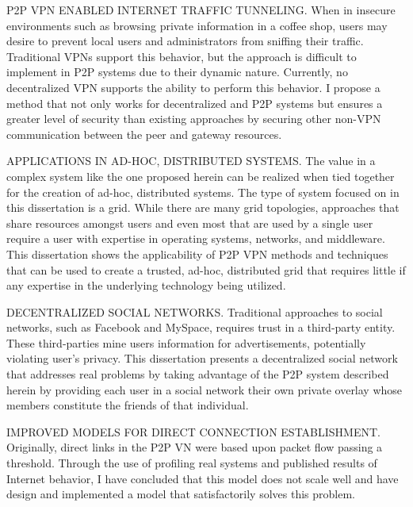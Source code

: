 P2P VPN ENABLED INTERNET TRAFFIC TUNNELING. When in insecure environments such
as browsing private information in a coffee shop, users may desire to prevent
local users and administrators from sniffing their traffic.  Traditional VPNs
support this behavior, but the approach is difficult to implement in P2P
systems due to their dynamic nature.  Currently, no decentralized VPN supports
the ability to perform this behavior.  I propose a method that not only works
for decentralized and P2P systems but ensures a greater level of security than
existing approaches by securing other non-VPN communication between the peer
and gateway resources.

APPLICATIONS IN AD-HOC, DISTRIBUTED SYSTEMS. The value in a complex system
like the one proposed herein can be realized when tied together for the
creation of ad-hoc, distributed systems.  The type of system focused on in
this dissertation is a grid.  While there are many grid topologies, approaches
that share resources amongst users and even most that are used by a single
user require a user with expertise in operating systems, networks, and
middleware.  This dissertation shows the applicability of P2P VPN methods and
techniques that can be used to create a trusted, ad-hoc, distributed grid that
requires little if any expertise in the underlying technology being utilized.

DECENTRALIZED SOCIAL NETWORKS. Traditional approaches to social networks, such
as Facebook and MySpace, requires trust in a third-party entity.  These
third-parties mine users information for advertisements, potentially violating
user's privacy.  This dissertation presents a decentralized social network that
addresses real problems by taking advantage of the P2P system described herein
by providing each user in a social network their own private overlay whose
members constitute the friends of that individual.

IMPROVED MODELS FOR DIRECT CONNECTION ESTABLISHMENT.  Originally, direct links
in the P2P VN were based upon packet flow passing a threshold.  Through the use
of profiling real systems and published results of Internet behavior, I have
concluded that this model does not scale well and have design and implemented a
model that satisfactorily solves this problem.

